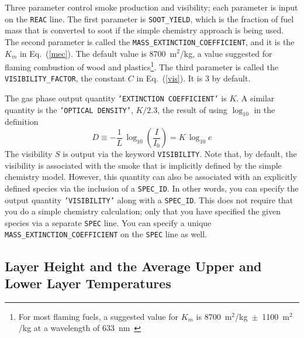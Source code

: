 \documentclass[11pt]{book}
\newcommand{\ct}{\tt\small}
\newcommand{\be}{\begin{equation}}
\newcommand{\ee}{\end{equation}}
\begin{document}
Three parameter control smoke production and visibility; each
parameter is input on the {\ct REAC} line. The first parameter
is {\ct SOOT\_YIELD}, which is the fraction of fuel mass that
is converted to soot if the simple chemistry approach is being used. The second parameter is called the
{\ct MASS\_EXTINCTION\_COEFFICIENT}, and it is the $K_m$ in
Eq.~(\ref{mec}). The default value is 8700~m$^2$/kg, a value
suggested for flaming combustion of wood and plastics\footnote{For most flaming fuels, a suggested value for $K_m$ is 8700~m$^2$/kg~$\pm$~1100~m$^2$/kg at a
wavelength of 633~nm~\cite{Mulholland:F+M}}.
The third parameter is called the {\ct VISIBILITY\_FACTOR}, the
constant $C$ in Eq.~(\ref{vis}). It is 3 by default.

The gas phase output quantity {\ct 'EXTINCTION COEFFICIENT'} is $K$. A similar quantity is the
{\ct 'OPTICAL DENSITY'}, $K/2.3$, the result of using $\log_{10}$ in the definition
\be D \equiv - \frac{1}{L} \, \log_{10} \left( \frac{I}{I_0} \right) = K \, \log_{10} e   \ee
The visibility $S$ is output via the keyword {\ct VISIBILITY}. Note
that, by default, the visibility is associated with the smoke that is implicitly defined by the simple chemistry
model. However, this quantity can also be associated with an
explicitly defined species via the inclusion of a {\ct SPEC\_ID}.
In other words, you can specify the output quantity {\ct 'VISIBILITY'} along with a {\ct SPEC\_ID}.
This does not require that you do a simple chemistry calculation; only that you have specified the given species via a separate
{\ct SPEC} line. You can
specify a unique {\ct MASS\_EXTINCTION\_COEFFICIENT} on the {\ct SPEC} line as well.


\subsection{Layer Height and the Average Upper and Lower Layer Temperatures}
\label{info:layerheight}
\end{document}
